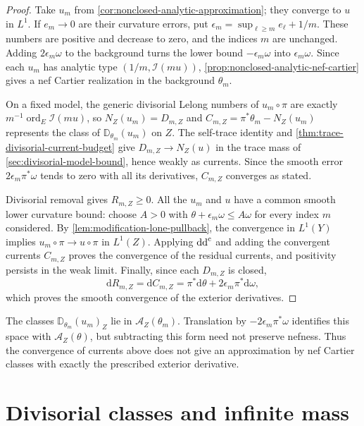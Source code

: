 \begin{proof}
Take $u_m$ from \cref{cor:nonclosed-analytic-approximation}; they converge to $u$ in $L^1$. If $e_m\to0$ are their curvature errors, put $\epsilon_m=\sup_{\ell\geq m}e_\ell+1/m$. These numbers are positive and decrease to zero, and the indices $m$ are unchanged. Adding $2\epsilon_m\omega$ to the background turns the lower bound $-\epsilon_m\omega$ into $\epsilon_m\omega$. Since each $u_m$ has analytic type $(1/m,\mathcal I(mu))$, \cref{prop:nonclosed-analytic-nef-cartier} gives a nef Cartier realization in the background $\theta_m$.

On a fixed model, the generic divisorial Lelong numbers of $u_m\circ\pi$ are exactly $m^{-1}\operatorname{ord}_E\mathcal I(mu)$, so $N_Z(u_m)=D_{m,Z}$ and $C_{m,Z}=\pi^*\theta_m-N_Z(u_m)$ represents the class of $\mathbb D_{\theta_m}(u_m)$ on $Z$. The self-trace identity and \cref{thm:trace-divisorial-current-budget} give $D_{m,Z}\to N_Z(u)$ in the trace mass of \cref{sec:divisorial-model-bound}, hence weakly as currents. Since the smooth error $2\epsilon_m\pi^*\omega$ tends to zero with all its derivatives, $C_{m,Z}$ converges as stated.

Divisorial removal gives $R_{m,Z}\geq0$. All the $u_m$ and $u$ have a common smooth lower curvature bound: choose $A>0$ with $\theta+\epsilon_m\omega\leq A\omega$ for every index $m$ considered. By \cref{lem:modification-lone-pullback}, the convergence in $L^1(Y)$ implies $u_m\circ\pi\to u\circ\pi$ in $L^1(Z)$. Applying $\mathrm{dd}^{\mathrm{c}}$ and adding the convergent currents $C_{m,Z}$ proves the convergence of the residual currents, and positivity persists in the weak limit. Finally, since each $D_{m,Z}$ is closed,
\[
 \mathrm{d}R_{m,Z}=\mathrm{d}C_{m,Z}
 =\pi^*\mathrm{d}\theta+2\epsilon_m\pi^*\mathrm{d}\omega,
\]
which proves the smooth convergence of the exterior derivatives.
\end{proof}

The classes $\mathbb D_{\theta_m}(u_m)_Z$ lie in $\mathscr A_Z(\theta_m)$. Translation by $-2\epsilon_m\pi^*\omega$ identifies this space with $\mathscr A_Z(\theta)$, but subtracting this form need not preserve nefness. Thus the convergence of currents above does not give an approximation by nef Cartier classes with exactly the prescribed exterior derivative.

\section{Divisorial classes and infinite mass}\label{sec:affine-infinite-mass}

